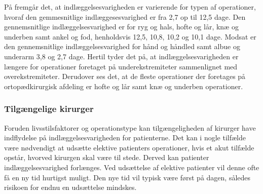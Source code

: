 \noindent
På  fremgår det, at indlæggelsesvarigheden er varierende for typen af operationer, hvoraf den gemmesnitlige indlæggesesvarighed er fra 2,7 op til 12,5 dage. Den gennemsnitlige indlæggelsesvarighed er for ryg og hals, hofte og lår, knæ og underben samt ankel og fod, henholdsvis 12,5, 10,8, 10,2 og 10,1 dage. Modsat er den gennemsnitlige indlæggelsesvarighed for hånd og håndled samt albue og underarm 3,8 og 2,7 dage. Hertil tyder det på, at indlæggelsesvarigheden er længere for operationer foretaget på underekstremiteter sammenlignet med overekstremiteter. Derudover ses det, at de fleste operationer der foretages på ortopædkirurgisk afdeling er  hofte og lår samt knæ og underben operationer. 


\subsubsection{Tilgængelige kirurger}
Foruden livsstilsfaktorer og operationstype kan tilgængeligheden af kirurger have indflydelse på indlæggelsesvarigheden for patienterne. Det kan i nogle tilfælde være nødvendigt at udsætte elektive patienters operationer, hvis et akut tilfælde opstår, hvorved kirurgen skal være til stede. Derved kan patienter indlæggelsesvarighed forlænges. Ved udsættelse af elektive patienter vil denne ofte få en ny tid hurtigst muligt. Den nye tid vil typisk være først på dagen, således risikoen for endnu en udsættelse mindskes.